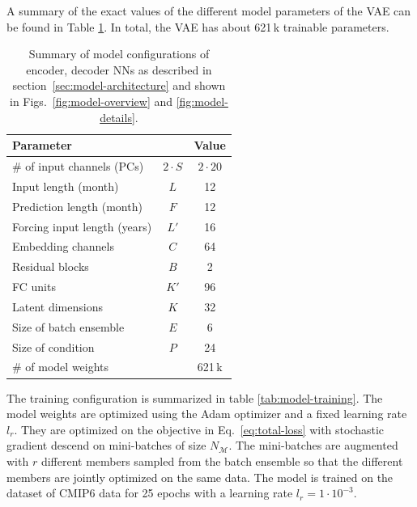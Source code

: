 \documentclass[english,a4paper,10pt]{scrartcl}
\begin{document}
A summary of the exact values of the different model parameters of the VAE can be found in Table \ref{tab:model-params}. In total, the VAE has about 621\,k trainable parameters.
\begin{table}
    \caption{\label{tab:model-params}Summary of model configurations of encoder, decoder NNs as described in section~\ref{sec:model-architecture} and shown in Figs.~\ref{fig:model-overview} and \ref{fig:model-details}.}
    \centering{}
    \begin{tabular}{lcc}
        \toprule
        Parameter                    &             & Value        \\
        \midrule
        \# of input channels (PCs)   & $2 \cdot S$ & $2 \cdot 20$ \\
        Input length (month)         & $L$         & 12           \\
        Prediction length (month)    & $F$         & 12           \\
        Forcing input length (years) & $L'$        & 16           \\
        Embedding channels           & $C$         & 64           \\
        Residual blocks              & $B$         & 2            \\
        FC units                     & $K'$        & 96           \\
        Latent dimensions            & $K$         & 32           \\
        Size of batch ensemble       & $E$         & 6            \\
        Size of condition            & $P$         & 24           \\
        \midrule
        \# of model weights          &             & 621\,k       \\
        \bottomrule
    \end{tabular}
\end{table}

The training configuration is summarized in table \ref{tab:model-training}. The model weights are optimized using the Adam optimizer \citep{Kingma.Ba.2014} and a fixed learning rate $l_r$. They are optimized on the objective in Eq.~\eqref{eq:total-loss} with stochastic gradient descend on mini-batches of size $N_{\mathcal{M}}$. The mini-batches are augmented with $r$ different members sampled from the batch ensemble so that the different members are jointly optimized on the same data. The model is trained on the dataset of CMIP6 data for 25 epochs with a learning rate $l_r=1 \cdot 10^{-3}$.
\end{document}
